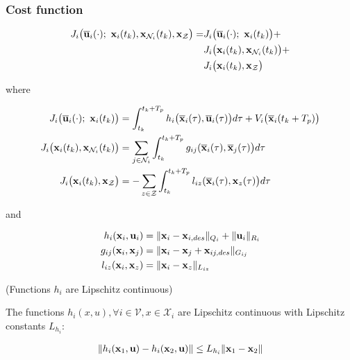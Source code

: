 \subsubsection{Cost function}

\begin{align}
  J_i \big(\overline{\bm{\mathbf{u}}}_i (\cdot);\ \bm{\mathbf{x}}_i(t_k), \bm{\mathbf{x}}_{\mathcal{N}_i}(t_k), \bm{\mathbf{x}}_{\mathcal{Z}}\big) =
    &J_i \big(\overline{\bm{\mathbf{u}}}_i (\cdot);\ \bm{\mathbf{x}}_i(t_k)\big) + \\
    &J_i \big(\bm{\mathbf{x}}_i (t_k), \bm{\mathbf{x}}_{\mathcal{N}_i}(t_k)\big) + \\
    &J_i \big(\bm{\mathbf{x}}_i (t_k), \bm{\mathbf{x}}_{\mathcal{Z}}\big)
\end{align}

where

\begin{align}
  J_i \big(\overline{\bm{\mathbf{u}}}_i (\cdot);\ \bm{\mathbf{x}}_i(t_k)\big) &=
    \int_{t_k}^{t_k + T_p} h_i \big(\overline{\bm{\mathbf{x}}}_i (\tau), \overline{\bm{\mathbf{u}}}_i (\tau)\big) d \tau +
    V_i \big(\overline{\bm{\mathbf{x}}}_i (t_k + T_p)\big) \\
  J_i \big(\bm{\mathbf{x}}_i (t_k), \bm{\mathbf{x}}_{\mathcal{N}_i}(t_k)\big) &=
    \sum_{j \in \mathcal{N}_i} \int_{t_k}^{t_k + T_p} g_{ij} (\overline{\bm{\mathbf{x}}}_i (\tau), \overline{\bm{\mathbf{x}}}_j (\tau)\big) d \tau \\
  J_i \big(\bm{\mathbf{x}}_i (t_k), \bm{\mathbf{x}}_{\mathcal{Z}}\big) &=
    -\sum_{z \in \mathcal{Z}} \int_{t_k}^{t_k + T_p} l_{iz} (\overline{\bm{\mathbf{x}}}_i (\tau), \bm{\mathbf{x}}_z (\tau)\big) d \tau
\end{align}

and

\begin{align}
  h_i(\bm{\mathbf{x}}_i, \bm{\mathbf{u}}_i) &= \| \bm{\mathbf{x}}_i - \bm{\mathbf{x}}_{i,des}\|_{Q_i} + \| \bm{\mathbf{u}}_i\|_{R_i} \\
  g_{ij}(\bm{\mathbf{x}}_i, \bm{\mathbf{x}}_j) &= \| \bm{\mathbf{x}}_i - \bm{\mathbf{x}}_j + \bm{\mathbf{x}}_{ij,des} \|_{G_{ij}} \\
  l_{iz}(\bm{\mathbf{x}}_i, \bm{\mathbf{x}}_z) &= \| \bm{\mathbf{x}}_i - \bm{\mathbf{x}}_z \|_{L_{iz}} \\
\end{align}


\begin{gg_box}
\begin{assumption} (Functions $h_i$ are Lipschitz continuous)

  The functions $h_i(x,u), \forall i \in \mathcal{V}, x \in \mathcal{X}_i$ are
  Lipschitz continuous with Lipschitz constants $L_{h_i}$:

  \begin{align}
    \| h_i(\bm{\mathbf{x}}_1, \bm{\mathbf{u}}) - h_i(\bm{\mathbf{x}}_2, \bm{\mathbf{u}})\| \leq L_{h_i} \|\bm{\mathbf{x}}_1 - \bm{\mathbf{x}}_2 \|
  \end{align}

  \label{ass:h_i_Lipschitz}
\end{assumption}
\end{gg_box}


